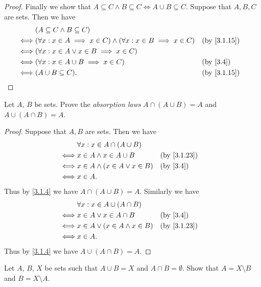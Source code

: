 \begin{proof}
  Finally we show that \(A \subseteq C \land B \subseteq C \iff A \cup B \subseteq C\).
  Suppose that \(A, B, C\) are sets.
  Then we have
  \begin{align*}
         & (A \subseteq C \land B \subseteq C)                                                                  \\
    \iff & (\forall x : x \in A \implies x \in C) \land (\forall x : x \in B \implies x \in C) &  & \by{3.1.15} \\
    \iff & (\forall x : x \in A \lor x \in B \implies x \in C)                                                  \\
    \iff & (\forall x : x \in A \cup B \implies x \in C)                                       &  & \by{3.4}    \\
    \iff & (A \cup B \subseteq C).                                                             &  & \by{3.1.15}
  \end{align*}
\end{proof}

\begin{ex}\label{ex:3.1.8}
  Let \(A\), \(B\) be sets.
  Prove the \emph{absorption laws} \(A \cap (A \cup B) = A\) and \(A \cup (A \cap B) = A\).
\end{ex}

\begin{proof}
  Suppose that \(A, B\) are sets.
  Then we have
  \begin{align*}
         & \forall x : x \in A \cap (A \cup B)                   \\
    \iff & x \in A \land x \in A \cup B         &  & \by{3.1.23} \\
    \iff & x \in A \land (x \in A \lor x \in B) &  & \by{3.4}    \\
    \iff & x \in A.
  \end{align*}
  Thus by \cref{3.1.4} we have \(A \cap (A \cup B) = A\).
  Similarly we have
  \begin{align*}
         & \forall x : x \in A \cup (A \cap B)                   \\
    \iff & x \in A \lor x \in A \cap B          &  & \by{3.4}    \\
    \iff & x \in A \lor (x \in A \land x \in B) &  & \by{3.1.23} \\
    \iff & x \in A.
  \end{align*}
  Thus by \cref{3.1.4} we have \(A \cup (A \cap B) = A\).
\end{proof}

\begin{ex}\label{ex:3.1.9}
  Let \(A\), \(B\), \(X\) be sets such that \(A \cup B = X\) and \(A \cap B = \emptyset\).
  Show that \(A = X \setminus B\) and \(B = X \setminus A\).
\end{ex}

